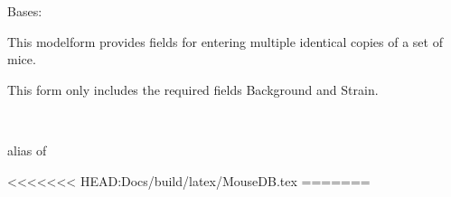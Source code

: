 \documentclass[letterpaper,10pt,english]{sphinxmanual}
\begin{document}
\begin{fulllineitems}
\label{api:animal.forms.MultipleAnimalForm}
Bases: 

This modelform provides fields for entering multiple identical copies of a set of mice.

This form only includes the required fields Background and Strain.

\begin{fulllineitems}
\label{api:animal.forms.MultipleAnimalForm.Meta}~

\begin{fulllineitems}
\label{api:animal.forms.MultipleAnimalForm.Meta.model}
alias of 

\end{fulllineitems}


\end{fulllineitems}


\begin{fulllineitems}
\label{api:animal.forms.MultipleAnimalForm.media}
\end{fulllineitems}
<<<<<<< HEAD:Docs/build/latex/MouseDB.tex
=======


\end{fulllineitems}

\end{document}
